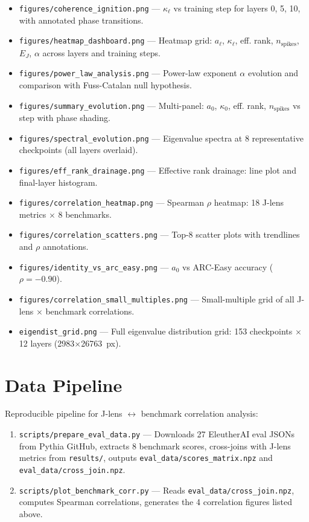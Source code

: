 \documentclass[11pt,a4paper]{article}
\begin{document}
\begin{itemize}
  \item \texttt{figures/coherence\_ignition.png} --- $\kappa_\ell$ vs training step for layers 0, 5, 10, with annotated phase transitions.
  \item \texttt{figures/heatmap\_dashboard.png} --- Heatmap grid: $a_\ell$, $\kappa_\ell$, eff. rank, $n_{\text{spikes}}$, $E_J$, $\alpha$ across layers and training steps.
  \item \texttt{figures/power\_law\_analysis.png} --- Power-law exponent $\alpha$ evolution and comparison with Fuss-Catalan null hypothesis.
  \item \texttt{figures/summary\_evolution.png} --- Multi-panel: $a_0$, $\kappa_0$, eff. rank, $n_{\text{spikes}}$ vs step with phase shading.
  \item \texttt{figures/spectral\_evolution.png} --- Eigenvalue spectra at 8 representative checkpoints (all layers overlaid).
  \item \texttt{figures/eff\_rank\_drainage.png} --- Effective rank drainage: line plot and final-layer histogram.
  \item \texttt{figures/correlation\_heatmap.png} --- Spearman $\rho$ heatmap: 18 J-lens metrics $\times$ 8 benchmarks.
  \item \texttt{figures/correlation\_scatters.png} --- Top-8 scatter plots with trendlines and $\rho$ annotations.
  \item \texttt{figures/identity\_vs\_arc\_easy.png} --- $a_0$ vs ARC-Easy accuracy ($\rho = -0.90$).
  \item \texttt{figures/correlation\_small\_multiples.png} --- Small-multiple grid of all J-lens $\times$ benchmark correlations.
  \item \texttt{eigendist\_grid.png} --- Full eigenvalue distribution grid: 153 checkpoints $\times$ 12 layers (2983$\times$26763~px).
\end{itemize}

\section{Data Pipeline}

Reproducible pipeline for J-lens $\leftrightarrow$ benchmark correlation analysis:

\begin{enumerate}
  \item \texttt{scripts/prepare\_eval\_data.py} --- Downloads 27 EleutherAI eval JSONs from Pythia GitHub, extracts 8 benchmark scores, cross-joins with J-lens metrics from \texttt{results/}, outputs \texttt{eval\_data/scores\_matrix.npz} and \texttt{eval\_data/cross\_join.npz}.
  \item \texttt{scripts/plot\_benchmark\_corr.py} --- Reads \texttt{eval\_data/cross\_join.npz}, computes Spearman correlations, generates the 4 correlation figures listed above.
\end{enumerate}
\end{document}
